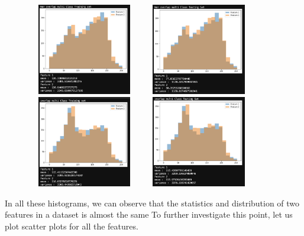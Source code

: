 \documentclass[conference]{IEEEtran}
\begin{document}
\pagebreak
\begin{figure}
    \centering
    \includegraphics[width=5cm, height=4cm]{task1.9.png} 
    \includegraphics[width=5cm, height=4cm]{task1.10.png}
    \includegraphics[width=5cm, height=4cm]{task1.11.png}
    \includegraphics[width=5cm, height=4cm]{task1.12.png}
    \label{fig:my_label}
\end{figure} 
In all these histograms, we can observe that the statistics and distribution of two features in a dataset is almost the same To further investigate this point, let us plot scatter plots for all the features.
\end{document}
